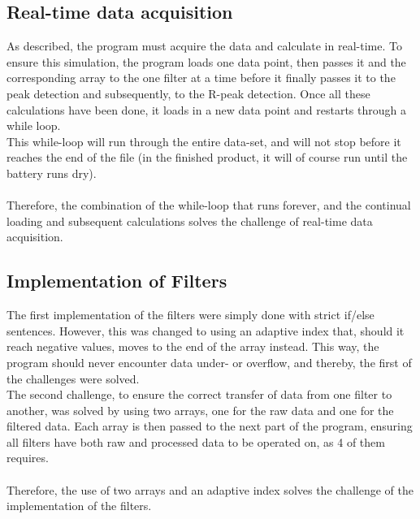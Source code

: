 \documentclass[12pt,a4paper]{article}
\begin{document}
\subsection{Real-time data acquisition}
	As described, the program must acquire the data and calculate in real-time. To ensure this simulation, the program loads one data point, then passes it and the corresponding array to the one filter at a time before it finally passes it to the peak detection and subsequently, to the R-peak detection. Once all these calculations have been done, it loads in a new data point and restarts through a while loop.\\
	This while-loop will run through the entire data-set, and will not stop before it reaches the end of the file (in the finished product, it will of course run until the battery runs dry).\\
	\\
	Therefore, the combination of the while-loop that runs forever, and the continual loading and subsequent calculations solves the challenge of real-time data acquisition.\\

\subsection{Implementation of Filters}
	The first implementation of the filters were simply done with strict if/else sentences. However, this was changed to using an adaptive index that, should it reach negative values, moves to the end of the array instead. This way, the program should never encounter data under- or overflow, and thereby, the first of the challenges were solved.\\
	The second challenge, to ensure the correct transfer of data from one filter to another, was solved by using two arrays, one for the raw data and one for the filtered data. Each array is then passed to the next part of the program, ensuring all filters have both raw and processed data to be operated on, as 4 of them requires.\\
	\\
	Therefore, the use of two arrays and an adaptive index solves the challenge of the implementation of the filters.\\
	
\end{document}
